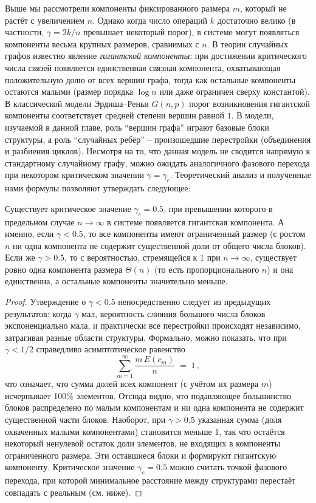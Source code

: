Выше мы рассмотрели компоненты фиксированного размера $m$, который не растёт с увеличением $n$. Однако когда число операций $k$ достаточно велико (в частности, $\gamma = 2k/n$ превышает некоторый порог), в системе могут появляться компоненты весьма крупных размеров, сравнимых с $n$. В теории случайных графов известно явление \emph{гигантской компоненты}: при достижении критического числа связей появляется единственная связная компонента, охватывающая положительную долю от всех вершин графа, тогда как остальные компоненты остаются малыми (размер порядка $\log n$ или даже ограничен сверху константой). В классической модели Эрдиша--Реньи $G(n,p)$ порог возникновения гигантской компоненты соответствует средней степени вершин равной $1$. В модели, изучаемой в данной главе, роль ``вершин графа'' играют базовые блоки структуры, а роль ``случайных ребёр'' -- произошедшие перестройки (объединения и разбиения циклов). Несмотря на то, что данная модель не сводится напрямую к стандартному случайному графу, можно ожидать аналогичного фазового перехода при некотором критическом значении $\gamma = \gamma_c$.
Теоретический анализ \cite{Alexeev2017} и полученные нами формулы позволяют утверждать следующее:

\begin{proposition}
Существует критическое значение $\gamma_c = 0.5$, при превышении которого в предельном случае $n \to \infty$ в системе появляется гигантская компонента. А именно, если $\gamma < 0.5$, то все компоненты имеют ограниченный размер (с ростом $n$ ни одна компонента не содержит существенной доли от общего числа блоков). Если же $\gamma > 0.5$, то с вероятностью, стремящейся к 1 при $n\to\infty$, существует ровно одна компонента размера $\Theta(n)$ (то есть пропорционального $n$) и она единственна, а остальные компоненты значительно меньше.
\end{proposition}

\begin{proof}
Утверждение о $\gamma < 0.5$ непосредственно следует из предыдущих результатов: когда $\gamma$ мал, вероятность слияния большого числа блоков экспоненциально мала, и практически все перестройки происходят независимо, затрагивая разные области структуры. Формально, можно показать, что при $\gamma < 1/2$ справедливо асимптотическое равенство 
\[
\sum_{m=1}^{\infty} \frac{m\, E(c_m)}{n} \;=\; 1\,,
\] 
что означает, что сумма долей всех компонент (с учётом их размера $m$) исчерпывает 100\% элементов. Отсюда видно, что подавляющее большинство блоков распределено по малым компонентам и ни одна компонента не содержит существенной части блоков. Наоборот, при $\gamma > 0.5$ указанная сумма (доля охваченных малыми компонентами) становится меньше 1, так что остаётся некоторый ненулевой остаток доли элементов, не входящих в компоненты ограниченного размера. Эти оставшиеся блоки и формируют гигантскую компоненту. Критическое значение $\gamma_c = 0.5$ можно считать точкой фазового перехода, при которой минимальное расстояние между структурами перестаёт совпадать с реальным (см. ниже).
\end{proof}

